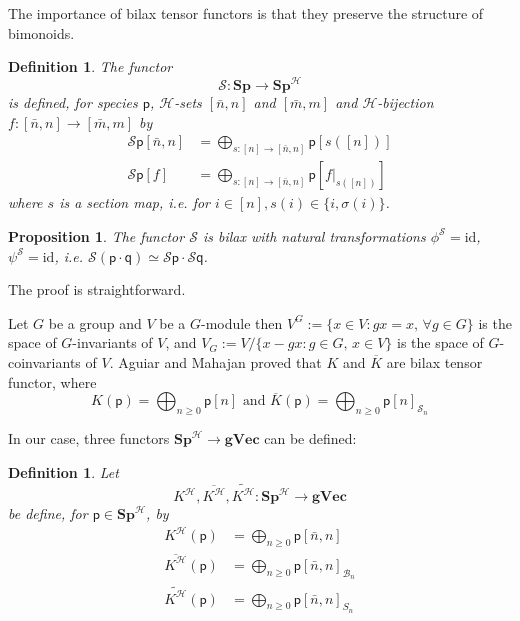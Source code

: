 \documentclass[11pt,reqno]{amsart}
\numberwithin{equation}{section}
\newtheorem{prop}[theorem]{Proposition}
\newtheorem{definition}[theorem]{Definition}
\def\S{{\mathbb S}}
\def\Sp{{\mathbf{Sp}}}
\def\SpB{{\mathbf{Sp}^{\H}}}
\def\gVec{{\mathbf{gVec}}}
\def\H{{\mathcal{H}}}
\def\p{{\textsf{p}}}
\def\q{{\textsf{q}}}
\def\S{{\mathcal{S}}}
\def\Kb{\overline{K}}
\def\KB{K^{\H}}
\def\KBb{\overline{K^{\H}}}
\def\KBt{\widetilde{K^{\H}}}
\def\n{\bar{n},n}
\def\m{\bar{m},m}
\def\sn{s\colon [n]\rightarrow [\bar{n},n]}
\def\id{\mathrm{id}}
\def\Sn{\mathbf{\mathcal{S}}_n}
\def\Bn{\mathcal{B}_n}
\begin{document}
The importance of bilax tensor functors is that they preserve the structure of bimonoids.



\begin{definition}
The functor
$$\S:\Sp\rightarrow \SpB$$
is defined, for species $\p$, $\H$-sets $[\n]$ and $[\m]$ and $\H$-bijection $f\colon [\n]\rightarrow [\m]$ by
\begin{equation}
\begin{aligned}
\S\p[\n] &= \bigoplus_{s:[n]\rightarrow [\bar{n},n]} \p[s([n])]\\
\S\p[f] &= \bigoplus_{\sn} \p[f|_{s([n])}]
\end{aligned}
\end{equation}
where $s$ is a section map, i.e. for $i\in [n], s(i)\in \{i,\sigma(i)\}$.
\end{definition}



\begin{prop}
The functor $\S$ is bilax with natural transformations $\phi^{\S}=\id$, $\psi^{\S}=\id$, i.e. $\S(\p\cdot\q)\simeq\S\p\cdot\S\q$.
\end{prop}
The proof is straightforward.

Let $G$ be a group and $V$ be a $G$-module then $V^G:=\{x\in V:gx=x,\,\forall g\in G \}$ is the space of $G$-invariants of $V$, and $V_G:=V/\{x-gx:g\in G,\,x\in V\}$ is the space of $G$-coinvariants of $V$. Aguiar and Mahajan \cite{Aguiar} proved that $K$ and $\Kb$ are bilax tensor functor, where
\begin{equation}
K(\p)=\bigoplus_{n\geq 0} \p[n] \text{ and } \Kb(\p)=\bigoplus_{n\geq 0} \p[n]_{\Sn}
\end{equation}

In our case, three functors $\SpB\rightarrow \gVec$ can be defined:
\begin{definition}
Let
\begin{equation*}
\KB,\KBb,\KBt \colon \SpB\rightarrow \gVec
\end{equation*}
be define, for $\p\in\SpB$, by
\begin{equation}
\begin{aligned}
\KB(\p) &= \bigoplus_{n\geq 0} \p[\bar{n},n]\\
\KBb(\p) &= \bigoplus_{n\geq 0} \p[\bar{n},n]_{\Bn}\\
\KBt(\p) &= \bigoplus_{n\geq 0} \p[\bar{n},n]_{S_n}
\end{aligned}
\end{equation}
\end{definition}
\end{document}
